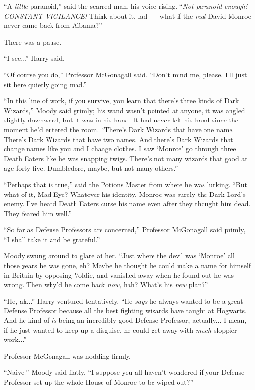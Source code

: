``A \emph{little} paranoid,'' said the scarred man, his voice rising. ``\emph{Not paranoid enough! CONSTANT VIGILANCE!} Think about it, lad~--- what if the \emph{real} David Monroe never came back from Albania?''

There was a pause.

``I see...'' Harry said.

``Of course you do,'' Professor McGonagall said. ``Don't mind me, please. I'll just sit here quietly going mad.''

``In this line of work, if you survive, you learn that there's three kinds of Dark Wizards,'' Moody said grimly; his wand wasn't pointed at anyone, it was angled slightly downward, but it was in his hand. It had never left his hand since the moment he'd entered the room. ``There's Dark Wizards that have one name. There's Dark Wizards that have two names. And there's Dark Wizards that change names like you and I change clothes. I saw `Monroe' go through three Death Eaters like he was snapping twigs. There's not many wizards that good at age forty-five. Dumbledore, maybe, but not many others.''

``Perhaps that is true,'' said the Potions Master from where he was lurking. ``But what of it, Mad-Eye? Whatever his identity, Monroe was surely the Dark Lord's enemy. I've heard Death Eaters curse his name even after they thought him dead. They feared him well.''

``So far as Defense Professors are concerned,'' Professor McGonagall said primly, ``I shall take it and be grateful.''

Moody swung around to glare at her. ``Just where the devil was `Monroe' all those years he was gone, eh? Maybe he thought he could make a name for himself in Britain by opposing Voldie, and vanished away when he found out he was wrong. Then why'd he come back \emph{now,} hah? What's his \emph{new} plan?''

``He, ah...'' Harry ventured tentatively. ``He \emph{says} he always wanted to be a great Defense Professor because all the best fighting wizards have taught at Hogwarts. And he kind of \emph{is} being an incredibly good Defense Professor, actually... I mean, if he just wanted to keep up a disguise, he could get away with \emph{much} sloppier work...''

Professor McGonagall was nodding firmly.

``Naive,'' Moody said flatly. ``I suppose you all haven't wondered if your Defense Professor set up the whole House of Monroe to be wiped out?''

